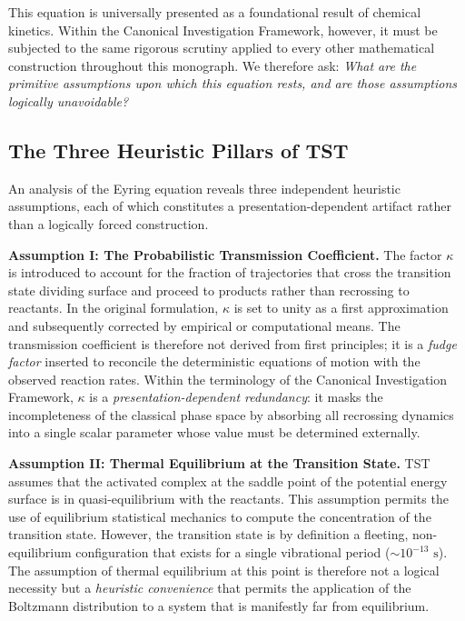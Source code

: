 \documentclass[11pt,openany]{extbook}
\theoremstyle{plain}
\theoremstyle{definition}
\begin{document}
\noindent This equation is universally presented as a foundational result of chemical kinetics. Within the Canonical Investigation Framework, however, it must be subjected to the same rigorous scrutiny applied to every other mathematical construction throughout this monograph. We therefore ask: \emph{What are the primitive assumptions upon which this equation rests, and are those assumptions logically unavoidable?}

\subsection{The Three Heuristic Pillars of TST}

\noindent An analysis of the Eyring equation reveals three independent heuristic assumptions, each of which constitutes a presentation-dependent artifact rather than a logically forced construction.

\noindent \textbf{Assumption I: The Probabilistic Transmission Coefficient.} The factor $\kappa$ is introduced to account for the fraction of trajectories that cross the transition state dividing surface and proceed to products rather than recrossing to reactants. In the original formulation, $\kappa$ is set to unity as a first approximation and subsequently corrected by empirical or computational means. The transmission coefficient is therefore not derived from first principles; it is a \emph{fudge factor} inserted to reconcile the deterministic equations of motion with the observed reaction rates. Within the terminology of the Canonical Investigation Framework, $\kappa$ is a \emph{presentation-dependent redundancy}: it masks the incompleteness of the classical phase space by absorbing all recrossing dynamics into a single scalar parameter whose value must be determined externally.

\noindent \textbf{Assumption II: Thermal Equilibrium at the Transition State.} TST assumes that the activated complex at the saddle point of the potential energy surface is in quasi-equilibrium with the reactants. This assumption permits the use of equilibrium statistical mechanics to compute the concentration of the transition state. However, the transition state is by definition a fleeting, non-equilibrium configuration that exists for a single vibrational period ($\sim 10^{-13}\text{ s}$). The assumption of thermal equilibrium at this point is therefore not a logical necessity but a \emph{heuristic convenience} that permits the application of the Boltzmann distribution to a system that is manifestly far from equilibrium.
\end{document}
